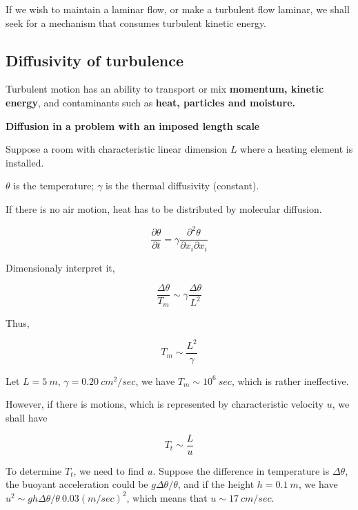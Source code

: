 If we wish to maintain a laminar flow, or make a turbulent flow laminar, we shall seek for a mechanism that consumes turbulent kinetic energy.

\subsection{Diffusivity of turbulence}

Turbulent motion has an ability to transport or mix \textbf{momentum, kinetic energy}, and contaminants such as \textbf{heat, particles and moisture.}

\textbf{Diffusion in a problem with an imposed length scale}

Suppose a room with characteristic linear dimension $L$ where a heating element is installed.

$\theta$ is the temperature; $\gamma$ is the thermal diffusivity (constant).

If there is no air motion, heat has to be distributed by molecular diffusion.

\begin{equation*}
    \frac{\partial \theta}{\partial t}=\gamma\frac{\partial^2\theta}{\partial x_i \partial x_i}
\end{equation*}

Dimensionaly interpret it,

\begin{equation*}
    \frac{\Delta \theta}{T_m}\sim\gamma\frac{\Delta\theta}{L^2}
\end{equation*}

Thus,

\begin{equation*}
    T_m\sim\frac{L^2}{\gamma}
\end{equation*}

Let $L=5\ m$, $\gamma=0.20\ cm^2/sec$, we have $T_m\sim 10^6\ sec$, which is rather ineffective.

However, if there is motions, which is represented by characteristic velocity $u$, we shall have

\begin{equation*}
    T_t\sim\frac{L}{u}
\end{equation*}

To determine $T_t$, we need to find $u$. Suppose the difference in temperature is $\Delta\theta$, the buoyant acceleration could be $g\Delta\theta/\theta$, and if the height $h=0.1\ m$, we have $u^2\sim gh\Delta \theta/\theta~0.03 (m/sec)^2$, which means that $u\sim 17\ cm/sec$.

